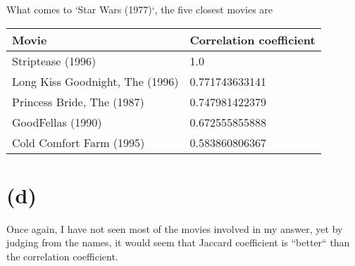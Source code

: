 \documentclass[10pt]{article}
\begin{document}
What comes to `Star Wars (1977)`, the five closest movies are
\begin{center}
\begin{tabular}{|l|l|}
\hline
Movie & Correlation coefficient \\
\hline
Striptease (1996) & 1.0 \\
Long Kiss Goodnight, The (1996)  & 0.771743633141 \\
Princess Bride, The (1987) & 0.747981422379 \\
GoodFellas (1990) & 0.672555855888 \\
Cold Comfort Farm (1995) & 0.583860806367 \\
\hline
\end{tabular}
\end{center}

\section*{(d)}
Once again, I have not seen most of the movies involved in my answer, yet by judging from the names, it would seem that Jaccard coefficient is ``better`` than the correlation coefficient.
\end{document}
